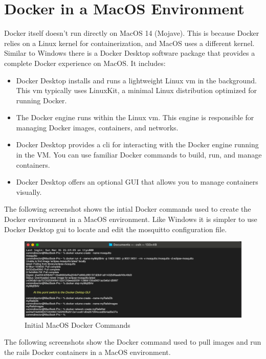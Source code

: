 \section{Docker in a MacOS Environment}
\label{sec:mac-cmds}
Docker itself doesn't run directly on MacOS 14 (Mojave). This is because Docker relies on a Linux kernel for containerization, and MacOS uses a different kernel. 
Similar to Windows there is a Docker Desktop software package that provides a complete Docker experience on MacOS. It includes:
\begin{itemize}
\item Docker Desktop installs and runs a lightweight Linux \gls{vm} in the background. This  \gls{vm} typically uses LinuxKit, a minimal Linux distribution optimized for running Docker.
\item The Docker engine runs within the Linux \gls{vm}. This engine is responsible for managing Docker images, containers, and networks.
\item Docker Desktop provides a \gls{cli} for interacting with the Docker engine running in the VM. You can use familiar Docker commands to build, run, and manage containers.
\item Docker Desktop offers an optional GUI that allows you to manage containers visually.
\end{itemize}
The following screenshot shows the intial Docker commands used to create the Docker environment in a MacOS environment. Like Windows it is simpler to use Docker Desktop \gls{gui} to locate and edit the mosquitto configuration file.
\begin{figure}[H]
    \centering
    \includegraphics[scale=0.5]{win1m.png}
    \caption{Initial MacOS Docker Commands}
    \label{fig:mac-docker-cmds}
\end{figure}
The following screenshots show the Docker command used to pull images and run the \gls{rails} Docker containers in a MacOS environment.
